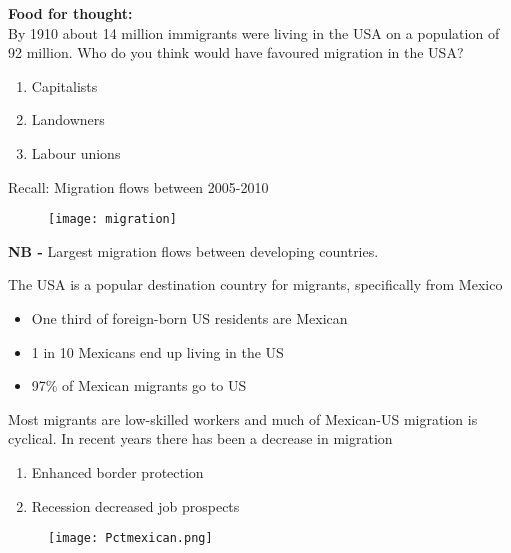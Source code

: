 \documentclass{beamer}
\begin{document}
\begin{frame}
 \textbf{Food for thought:}\\
 By 1910 about 14 million immigrants were living in the USA on a population of 92 million.
 Who do you think would have favoured migration in the USA?
 \begin{enumerate}
   \item Capitalists
   \item Landowners
   \item Labour unions
 \end{enumerate}
\end{frame}

\begin{frame}{Recall: Migration flows between 2005-2010}
  \begin{figure}
    \texttt{[image: migration]}
  \end{figure}  
  \medskip
  \textbf{NB -} Largest migration flows between developing countries.
\end{frame}

\begin{frame}
  The USA is a popular destination country for migrants, specifically from Mexico
  \begin{itemize}
    \item One third of foreign-born US residents are Mexican
    \item 1 in 10 Mexicans end up living in the US
    \item 97\% of Mexican migrants go to US
  \end{itemize}
  \medskip
  Most migrants are low-skilled workers and much of Mexican-US migration is cyclical.
  In recent years there has been a decrease in migration
  \begin{enumerate}
    \item Enhanced border protection
    \item Recession decreased job prospects
  \end{enumerate}
\end{frame}

\begin{frame}
 \begin{figure}
   \texttt{[image: Pctmexican.png]}
 \end{figure}
\end{frame}
\end{document}
